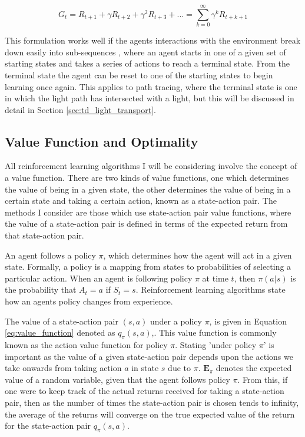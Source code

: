 \documentclass[ %
                    author={Callum Pearce},
                supervisor={Dr. Neill Campbell},
                    degree={MEng},
                     title={How effective are Temporal difference learning methods for reducing the number of zero contribution light paths while still accurately approximating Global Illumination in Path tracing?},
                  subtitle={},
                      type={research},
                      year={2019} ]{dissertation}
\begin{document}
\begin{equation}
\label{eq:return}
G_t = R_{t+1} + \gamma R_{t+2} + \gamma^2 R_{t+3} + ... = \sum^\infty_{k=0} \gamma^k R_{t+k+1}
\end{equation}

This formulation works well if the agents interactions with the environment break down easily into sub-sequences \cite{sutton2011reinforcement}, where an agent starts in one of a given set of starting states and takes a series of actions to reach a terminal state. From the terminal state the agent can be reset to one of the starting states to begin learning once again. This applies to path tracing, where the terminal state is one in which the light path has intersected with a light, but this will be discussed in detail in Section \ref{sec:td_light_transport}.

\subsection{Value Function and Optimality}
All reinforcement learning algorithms I will be considering involve the concept of a value function. There are two kinds of value functions, one which determines the value of being in a given state, the other determines the value of being in a certain state and taking a certain action, known as a state-action pair. The methods I consider are those which use state-action pair value functions, where the value of a state-action pair is defined in terms of the expected return from that state-action pair.

An agent follows a policy $\pi$, which determines how the agent will act in a given state. Formally, a policy is a mapping from states to probabilities of selecting a particular action. When an agent is following policy $\pi$ at time $t$, then $\pi(a|s)$ is the probability that $A_t = a$ if $S_t = s$. Reinforcement learning algorithms state how an agents policy changes from experience. 

The value of a state-action pair $(s,a)$ under a policy $\pi$, is given in Equation \ref{eq:value_function} denoted as $q_\pi(s,a)$,. This value function is commonly known as the action value function for policy $\pi$. Stating 'under policy $\pi$' is important as the value of a given state-action pair depends upon the actions we take onwards from taking action $a$ in state $s$ due to $\pi$. $\mathbf{E}_\pi$ denotes the expected value of a random variable, given that the agent follows policy $\pi$. From this, if one were to keep track of the actual returns received for taking a state-action pair, then as the number of times the state-action pair is chosen tends to infinity, the average of the returns will converge on the true expected value of the return for the state-action pair $q_\pi(s,a)$.
\end{document}
